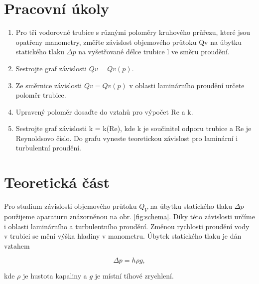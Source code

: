 \section{Pracovní úkoly}

\begin{enumerate}
\item Pro tři vodorovné trubice s různými poloměry kruhového průřezu, které jsou opatřeny manometry, změřte závislost objemového průtoku Qv na úbytku statického tlaku \(\Delta p\) na vyšetřované délce trubice l ve směru proudění.

\item Sestrojte graf závislosti \(Qv = Qv(p).\)

\item Ze směrnice závislosti \(Qv = Qv(p)\) v oblasti laminárního proudění určete poloměr trubice.

\item Upravený poloměr dosaďte do vztahů pro výpočet Re a k.

\item Sestrojte graf závislosti k = k(Re), kde k je součinitel odporu trubice a Re je Reynoldsovo číslo. Do grafu vyneste teoretickou závislost pro laminární i turbulentní proudění.
\end{enumerate}

\section{Teoretická část}

    Pro studium závislosti objemového průtoku \(Q_V\) na úbytku statického tlaku \(\Delta p\) použijeme aparaturu znázorněnou na obr. \ref{fig:schema}. Díky této závislosti určíme i oblasti laminárního a turbulentního proudění. Změnou rychlosti proudění vody v trubici se mění výška hladiny v manometru. Úbytek statického tlaku je dán vztahem

    \begin{equation}
        \Delta p = h\rho g,
    \end{equation}

    kde \(\rho\) je hustota kapaliny a \(g\) je místní tíhové zrychlení.

